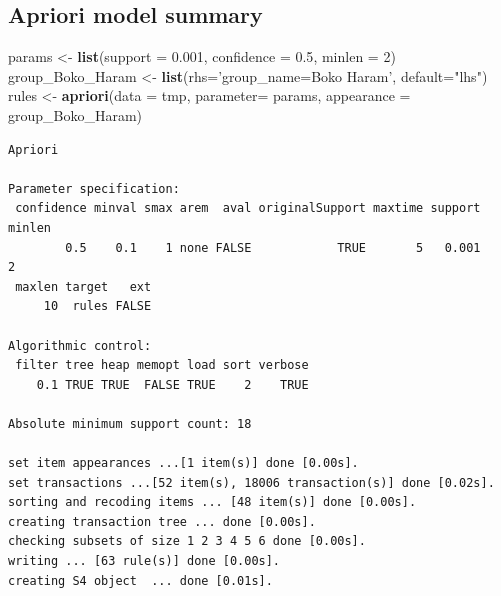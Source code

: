 \documentclass[11pt,oneside,a4paper]{reedthesis}
\newenvironment{Shaded}{\begin{snugshade}}{\end{snugshade}}
\newcommand{\KeywordTok}[1]{\textcolor[rgb]{0.13,0.29,0.53}{\textbf{#1}}}
\newcommand{\DataTypeTok}[1]{\textcolor[rgb]{0.13,0.29,0.53}{#1}}
\newcommand{\DecValTok}[1]{\textcolor[rgb]{0.00,0.00,0.81}{#1}}
\newcommand{\FloatTok}[1]{\textcolor[rgb]{0.00,0.00,0.81}{#1}}
\newcommand{\StringTok}[1]{\textcolor[rgb]{0.31,0.60,0.02}{#1}}
\newcommand{\NormalTok}[1]{#1}
\begin{document}
\subsection{Apriori model summary}\label{apriori-model-summary-2}
\begin{Shaded}
\begin{Highlighting}[]
\NormalTok{params <-}\StringTok{ }\KeywordTok{list}\NormalTok{(}\DataTypeTok{support =} \FloatTok{0.001}\NormalTok{, }\DataTypeTok{confidence =} \FloatTok{0.5}\NormalTok{, }\DataTypeTok{minlen =} \DecValTok{2}\NormalTok{)}
\NormalTok{group_Boko_Haram <-}\StringTok{ }\KeywordTok{list}\NormalTok{(}\DataTypeTok{rhs=}\StringTok{'group_name=Boko Haram'}\NormalTok{, }\DataTypeTok{default=}\StringTok{"lhs"}\NormalTok{)}
\NormalTok{rules <-}\StringTok{ }\KeywordTok{apriori}\NormalTok{(}\DataTypeTok{data =}\NormalTok{ tmp, }\DataTypeTok{parameter=}\NormalTok{ params, }\DataTypeTok{appearance =}\NormalTok{ group_Boko_Haram)}
\end{Highlighting}
\end{Shaded}
\begin{verbatim}
Apriori

Parameter specification:
 confidence minval smax arem  aval originalSupport maxtime support minlen
        0.5    0.1    1 none FALSE            TRUE       5   0.001      2
 maxlen target   ext
     10  rules FALSE

Algorithmic control:
 filter tree heap memopt load sort verbose
    0.1 TRUE TRUE  FALSE TRUE    2    TRUE

Absolute minimum support count: 18 

set item appearances ...[1 item(s)] done [0.00s].
set transactions ...[52 item(s), 18006 transaction(s)] done [0.02s].
sorting and recoding items ... [48 item(s)] done [0.00s].
creating transaction tree ... done [0.00s].
checking subsets of size 1 2 3 4 5 6 done [0.00s].
writing ... [63 rule(s)] done [0.00s].
creating S4 object  ... done [0.01s].
\end{verbatim}
\end{document}
